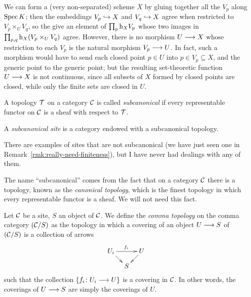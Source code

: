 \begin{2   CONTRAVARIANT FUNCTORS}
\begin{2.3 Sheaves in Grothendieck topologies}
\begin{remark}
We can form a (very non-separated) scheme $X$ by gluing together all the $V_p$ along $\operatorname{Spec} K$; then the embeddings $V_p \hookrightarrow X$ and $V_q \hookrightarrow X$ agree when restricted to $V_p \times_U V_q$, so the give an element of $\prod_{p}\mathrm{h}_X V_p$ whose two images in $\prod_{p,q} \mathrm{h}_X(V_p \times_U V_q)$ agree. However, there is no morphism $U \arr X$ whose restriction to each $V_p$ is the natural morphism $V_p \arr U$. In fact, such a morphism would have to send each closed point $p \in U$ into $p \in V_p \subseteq X$, and the generic point to the generic point; but the resulting set-theoretic function $U \arr X$ is not continuous, since all subsets of $X$ formed by closed points are closed, while only the finite sets are closed in $U$.

\end{remark}

\begin{definition}\label{def:subcanonical}
A topology $\mathcal{T}$ on a category $\mathcal{C}$ is called \emph{subcanonical} if every representable functor on $\mathcal{C}$ is a sheaf with respect to $\mathcal{T}$.

A \emph{subcanonical site} is a category endowed with a subcanonical topology.
\end{definition}

There are examples of sites that are not subcanonical (we have just seen one in Remark~\ref{rmk:really-need-finiteness}), but I have never had dealings with any of them.

The name ``subcanonical'' comes from the fact that on a category $\mathcal{C}$ there is a topology, known as the \emph{canonical topology}, which is the finest topology in which every representable functor is a sheaf. We will not need this fact.


\begin{definition}\label{def:comma-topology}
Let $\mathcal{C}$ be a site, $S$ an object of $\mathcal{C}$. We define the \emph{comma topology}  on the comma category $(\mathcal{C}/S)$ as the topology in which a covering of  an object $U \arr S$ of $(\mathcal{C}/S)$ is a collection of arrows
   \[
   \xymatrix@-15pt{
   U_i\ar[rr]^{f_i}\ar[rd] && U\ar[ld]\\
   &S
   }
   \]
such that the collection $\{f_i \colon U_i \arr U\}$ is a covering in $\mathcal{C}$. In other words, the coverings of $U \arr S$ are simply the coverings of $U$.
\end{definition}


\end{2.3 Sheaves in Grothendieck topologies}
\end{2   CONTRAVARIANT FUNCTORS}
